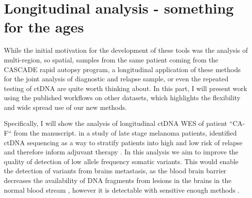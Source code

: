 \section[Longitudinal analysis]{Longitudinal analysis - something for the ages }
\label{variantcalling-sec:longitudinal}


While the initial motivation for the development of these tools was the analysis of multi-region, so spatial, samples from the same patient coming from the CASCADE rapid autopsy program, a longitudinal application of these methods for the joint analysis of diagnostic and relapse sample, or even the repeated testing of ctDNA are quite worth thinking about. In this part, I will present work using the published workflows on other datasets, which highlights the flexibility and wide spread use of our new methods.

Specifically, I will show the analysis of longitudinal ctDNA WES of patient ``CA-F`` from the manuscript. in a study of late stage melanoma patients,  identified ctDNA sequencing as a way to stratify patients into high and low risk of relapse and therefore inform adjuvant therapy \cite{Tan2019}. In this analysis we aim to improve the quality of detection of low allele frequency somatic variants. This would enable the detection of variants from brains metastasis, as the blood brain barrier decreases the availability of DNA fragments from lesions in the brains in the normal blood stream \cite{2014}, however it is detectable with sensitive enough methods \cite{Yoon2019,Ma2020}.

